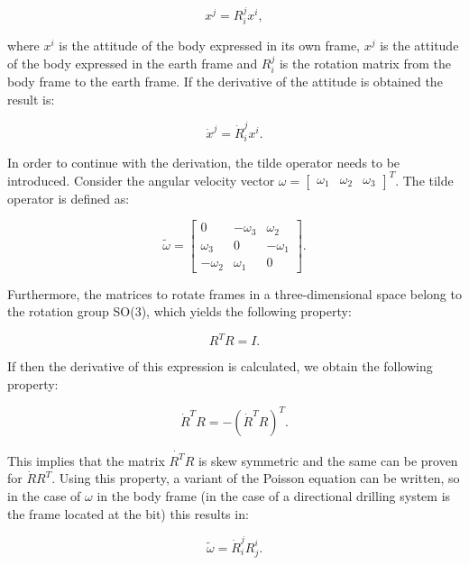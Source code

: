 \begin{equation}
	x^j = R_i^j x^i,
\end{equation}
 
 where $x^i$ is the attitude of the body expressed in its own frame, $x^j$ is the attitude of the body expressed in the earth frame and $R_i^j$ is the rotation matrix from the body frame to the earth frame. If the derivative of the attitude is obtained the result is:
 
 \begin{equation}
 	\dot{x}^j = \dot{R}_i^jx^i
 	\label{eq:dotx}.
 \end{equation}
 
In order to continue with the derivation, the tilde operator needs to be introduced. Consider the angular velocity vector $\omega = \begin{bmatrix}\omega_1 & \omega_2 & \omega_3\end{bmatrix}^T$. The tilde operator is defined as:

\begin{equation*}
	\tilde{\omega} = 
	\begin{bmatrix}
		0 & -\omega_3 & \omega_2 \\
		\omega_3 & 0 & -\omega_1 \\
		-\omega_2 & \omega_1 & 0
	\end{bmatrix}.
\end{equation*}
 
Furthermore, the matrices to rotate frames in a three-dimensional space belong to the rotation group SO(3), which yields the following property:

\begin{equation*}
	R^T R = I.
\end{equation*}

If then the derivative of this expression is calculated, we obtain the following property:

 \begin{equation*}
 	\dot{R}^TR = -(\dot{R}^TR)^T.
 \end{equation*}
 
 This implies that the matrix $\dot{R^T}R$ is skew symmetric and the same can be proven for $\dot{R}R^T$. Using this property, a variant of the Poisson equation can be written, so in the case of $\omega$ in the body frame (in the case of a directional drilling system is the frame located at the bit) this results in:
 
 \begin{equation}
 	\tilde{\omega} = \dot{R}_i^j R_j^i
 	\label{eq:omega}.
 \end{equation}
 
